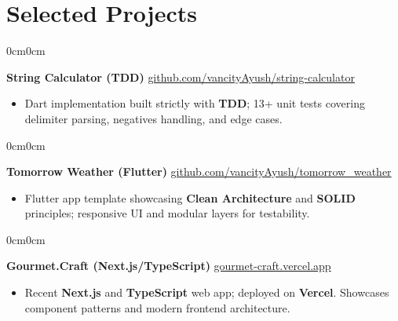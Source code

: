 \documentclass[10pt, letterpaper]{article}
\newenvironment{highlights}{
    \begin{itemize}[
        topsep=0.10 cm,
        parsep=0.10 cm,
        partopsep=0pt,
        itemsep=0.05cm, %
        leftmargin=10pt, %
        labelwidth=!, %
        labelsep=5pt %
    ]\justifying %
}{
    \end{itemize}
}
\newenvironment{onecolentry}{
    \begin{adjustwidth}{0cm}{0cm} %
    \RaggedRight %
}{
    \end{adjustwidth}
}
\begin{document}
    \section{Selected Projects}
        \begin{onecolentry}
            	\textbf{String Calculator (TDD)} \hfill \href{https://github.com/vancityAyush/string-calculator}{github.com/vancityAyush/string-calculator}
        \vspace{0.05cm}
        \begin{highlights}
            \item Dart implementation built strictly with \textbf{TDD}; 13+ unit tests covering delimiter parsing, negatives handling, and edge cases.
        \end{highlights}
    \end{onecolentry}
    \vspace{0.1 cm}
        \begin{onecolentry}
            	\textbf{Tomorrow Weather (Flutter)} \hfill \href{https://github.com/vancityAyush/tomorrow_weather}{github.com/vancityAyush/tomorrow\_weather}
        \vspace{0.05cm}
        \begin{highlights}
            \item Flutter app template showcasing \textbf{Clean Architecture} and \textbf{SOLID} principles; responsive UI and modular layers for testability.
        \end{highlights}
    \end{onecolentry}
    \vspace{0.1 cm}
        \begin{onecolentry}
            	\textbf{Gourmet.Craft (Next.js/TypeScript)} \hfill \href{https://gourmet-craft.vercel.app}{gourmet-craft.vercel.app}
        \vspace{0.05cm}
        \begin{highlights}
            \item Recent \textbf{Next.js} and \textbf{TypeScript} web app; deployed on \textbf{Vercel}. Showcases component patterns and modern frontend architecture.
        \end{highlights}
    \end{onecolentry}
\end{document}
